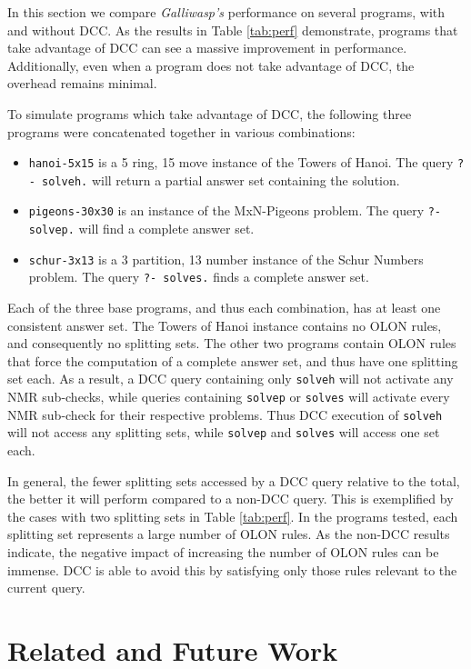 \documentclass{new_tlp}
\begin{document}
In this section we compare \textit{Galliwasp's} performance on several programs,
with and without DCC. As the results in Table \ref{tab:perf} demonstrate, 
programs that take advantage of DCC can see a massive improvement in 
performance. Additionally, even when a program does not take advantage of DCC, 
the overhead remains minimal.

To simulate programs which take advantage of DCC, the following three programs 
were concatenated together in various combinations:

\begin{itemize}
\item \texttt{hanoi-5x15} is a 5 ring, 15 move instance of the Towers of Hanoi.
	The query \texttt{?- solveh.} will return a partial answer set containing
	the solution.
\item \texttt{pigeons-30x30} is an instance of the MxN-Pigeons problem. The
	query \texttt{?- solvep.} will find a complete answer set.
\item \texttt{schur-3x13} is a 3 partition, 13 number instance of the Schur
	Numbers problem. The query \texttt{?- solves.} finds a complete answer set.
\end{itemize}

\noindent Each of the three base programs, and thus each combination, has at 
least one consistent answer set. The Towers of Hanoi instance contains no OLON 
rules, and consequently no splitting sets. The other two programs contain OLON 
rules that force the computation of a complete answer set, and thus have one 
splitting set each. As a result, a DCC query containing only \texttt{solveh} 
will not activate any NMR sub-checks, while queries containing \texttt{solvep} 
or \texttt{solves} will activate every NMR sub-check for their respective 
problems. Thus DCC execution of \texttt{solveh} will not access any splitting 
sets, while \texttt{solvep} and \texttt{solves} will access one set each.

In general, the fewer splitting sets accessed by a DCC query relative to the 
total, the better it will perform compared to a non-DCC query. This is
exemplified by the cases with two splitting sets in Table \ref{tab:perf}. In
the programs tested, each splitting set represents a large number of OLON
rules. As the non-DCC results indicate, the negative impact of increasing the
number of OLON rules can be immense. DCC is able to avoid this by satisfying
only those rules relevant to the current query.


\section{Related and Future Work} \label{sec:related}
\end{document}
